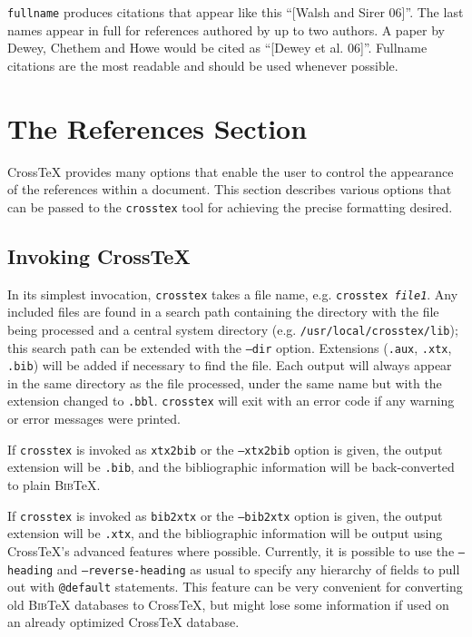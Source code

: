 \documentclass{article}
\newcommand{\XTX}{Cross\TeX}
\newcommand{\BibTeX}{\textsc{Bib}\TeX}
\begin{document}
\texttt{fullname} produces citations that appear like this ``[Walsh and
Sirer 06]''. The last names appear in full for references authored by
up to two authors. A paper by Dewey, Chethem and Howe would be cited as
``[Dewey et al. 06]''.  Fullname citations are the most readable and
should be used whenever possible.

\section{The References Section\label{sec:references}}

\XTX{} provides many options that enable the user to control the
appearance of the references within a document. This section describes
various options that can be passed to the \texttt{crosstex} tool for
achieving the precise formatting desired.

\subsection{Invoking \XTX{}}

In its simplest invocation, \texttt{crosstex} takes a file name,
e.g. \texttt{crosstex \textrm{\textit{file1}}}. Any included files are found in a
search path containing the directory with the file being processed and a
central system directory (e.g. \texttt{/usr/local/crosstex/lib}); this
search path can be extended with the \texttt{--dir} option. Extensions
(\texttt{.aux}, \texttt{.xtx}, \texttt{.bib}) will be added if necessary
to find the file. Each output will always appear in the same directory as
the file processed, under the same name but with the extension changed
to \texttt{.bbl}. \texttt{crosstex} will exit with an error code if any
warning or error messages were printed.

If \texttt{crosstex} is invoked as \texttt{xtx2bib} or the
\texttt{--xtx2bib} option is given, the output extension will be
\texttt{.bib}, and the bibliographic information will be back-converted
to plain \BibTeX{}.

If \texttt{crosstex} is invoked as \texttt{bib2xtx} or the
\texttt{--bib2xtx} option is given, the output extension will be
\texttt{.xtx}, and the bibliographic information will be output using
\XTX{}'s advanced features where possible.  Currently, it is possible
to use the \texttt{--heading} and \texttt{--reverse-heading} as usual
to specify any hierarchy of fields to pull out with \texttt{@default}
statements.  This feature can be very convenient for converting old
\BibTeX{} databases to \XTX{}, but might lose some information if used
on an already optimized \XTX{} database.
\end{document}
